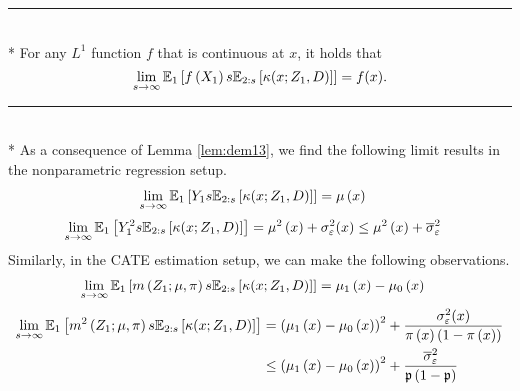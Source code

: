 \hrule

\begin{lem}\label{lem:dem13}\mbox{}\\*
	For any $L^1$ function $f$ that is continuous at $x$, it holds that
	\begin{equation}
		\lim _{s \rightarrow \infty} \mathbb{E}_{1}\left[f\left(X_1\right) s \mathbb{E}_{2:s}\left[\kappa(x; Z_1, D)\right]\right]
		= f(x).
	\end{equation}
\end{lem}

\hrule

\begin{lem}\label{lem:limit_res}\mbox{}\\*
	As a consequence of Lemma \ref{lem:dem13}, we find the following limit results in the nonparametric regression setup.
	\begin{equation}
		\begin{aligned}
			\lim_{s \rightarrow \infty} \mathbb{E}_{1}\left[Y_1 s \mathbb{E}_{2:s}\left[\kappa(x; Z_1, D)\right]\right]
			& = \mu\left(x\right)
		\end{aligned}
	\end{equation}
	\begin{equation}
		\begin{aligned}
			\lim_{s \rightarrow \infty} \mathbb{E}_{1}\left[Y_1^2 s \mathbb{E}_{2:s}\left[\kappa(x; Z_1, D)\right]\right]
			& = \mu^2\left(x\right) + \sigma_{\varepsilon}^{2}(x)
			\leq \mu^2\left(x\right) + \overline{\sigma}_{\varepsilon}^{2}
		\end{aligned}
	\end{equation}
	Similarly, in the CATE estimation setup, we can make the following observations.
	\begin{equation}
		\begin{aligned}
			\lim_{s \rightarrow \infty} \mathbb{E}_{1}\left[m\left(Z_{1}; \mu, \pi\right) s \mathbb{E}_{2:s}\left[\kappa(x; Z_1, D)\right]\right]
			& = \mu_1\left(x\right) - \mu_0\left(x\right)
		\end{aligned}
	\end{equation}          
	\begin{equation}
		\begin{aligned}
			\lim_{s \rightarrow \infty} \mathbb{E}_{1}\left[m^2\left(Z_{1}; \mu, \pi\right) s \mathbb{E}_{2:s}\left[\kappa(x; Z_1, D)\right]\right]
			& = \left(\mu_1\left(x\right) - \mu_0\left(x\right)\right)^2 + \frac{\sigma_{\varepsilon}^2(x)}{\pi\left(x\right)\left(1 - \pi\left(x\right)\right)}\\
			& \leq \left(\mu_1\left(x\right) - \mu_0\left(x\right)\right)^2 + \frac{\overline{\sigma}_{\varepsilon}^2}{\mathfrak{p}\left(1 - \mathfrak{p}\right)}
		\end{aligned}
	\end{equation}
\end{lem}

